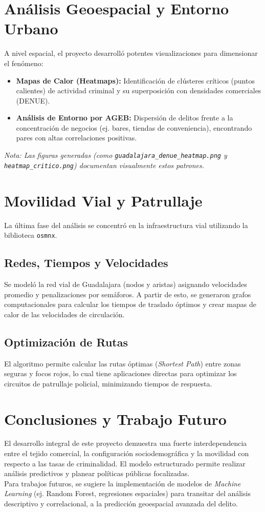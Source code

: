 \documentclass[12pt, a4paper]{article}
\begin{document}
\section{Análisis Geoespacial y Entorno Urbano}
A nivel espacial, el proyecto desarrolló potentes visualizaciones para dimensionar el fenómeno:
\begin{itemize}
    \item \textbf{Mapas de Calor (Heatmaps):} Identificación de clústeres críticos (puntos calientes) de actividad criminal y su superposición con densidades comerciales (DENUE).
    \item \textbf{Análisis de Entorno por AGEB:} Dispersión de delitos frente a la concentración de negocios (ej. bares, tiendas de conveniencia), encontrando pares con altas correlaciones positivas.
\end{itemize}
\textit{Nota: Las figuras generadas (como \texttt{guadalajara\_denue\_heatmap.png} y \texttt{heatmap\_critico.png}) documentan visualmente estos patrones.}

\section{Movilidad Vial y Patrullaje}
La última fase del análisis se concentró en la infraestructura vial utilizando la biblioteca \texttt{osmnx}. 
\subsection{Redes, Tiempos y Velocidades}
Se modeló la red vial de Guadalajara (nodos y aristas) asignando velocidades promedio y penalizaciones por semáforos. A partir de esto, se generaron grafos computacionales para calcular los tiempos de traslado óptimos y crear mapas de calor de las velocidades de circulación.
\subsection{Optimización de Rutas}
El algoritmo permite calcular las rutas óptimas (\textit{Shortest Path}) entre zonas seguras y focos rojos, lo cual tiene aplicaciones directas para optimizar los circuitos de patrullaje policial, minimizando tiempos de respuesta.

\section{Conclusiones y Trabajo Futuro}
El desarrollo integral de este proyecto demuestra una fuerte interdependencia entre el tejido comercial, la configuración sociodemográfica y la movilidad con respecto a las tasas de criminalidad. El modelo estructurado permite realizar análisis predictivos y planear políticas públicas focalizadas.
\\
Para trabajos futuros, se sugiere la implementación de modelos de \textit{Machine Learning} (ej. Random Forest, regresiones espaciales) para transitar del análisis descriptivo y correlacional, a la predicción geoespacial avanzada del delito.
\end{document}
